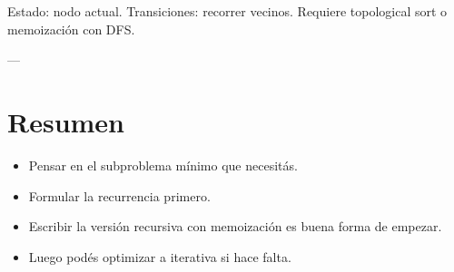 Estado: nodo actual.  
Transiciones: recorrer vecinos.  
Requiere topological sort o memoización con DFS.

---

\section{Resumen}

\begin{itemize}
\item Pensar en el subproblema mínimo que necesitás.
\item Formular la recurrencia primero.
\item Escribir la versión recursiva con memoización es buena forma de empezar.
\item Luego podés optimizar a iterativa si hace falta.
\end{itemize}
